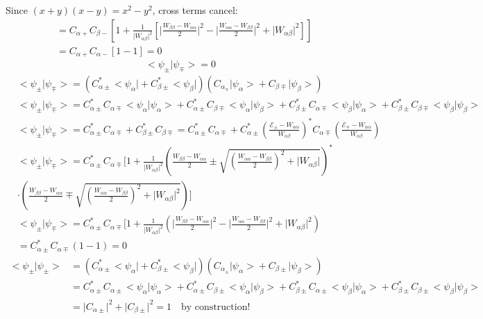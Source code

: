 \documentclass[12pt,fancychapters]{report}
\numberwithin{equation}{section}
\begin{document}
Since $(x+y)(x-y) = x^2-y^2$, cross terms cancel:
\begin{align*}
  &= C_{\alpha +}C_{\beta -} \left[ 1+\frac{1}{\big|W_{\alpha\beta}\big|^2}\left[
      \Bigg|\frac{W_{\beta\beta}-W_{\alpha\alpha}}{2}\Bigg|^2- \Bigg|\frac{
  W_{\alpha\alpha}-W_{\beta\beta}}{2}\Bigg|^2 + \big|W_{\alpha\beta}\big|^2\right]\right]\\
  &\boxed{= C_{\alpha +}C_{\alpha -}[1-1] = 0}
\end{align*}
\[
  \boxed{\big<\psi_\pm\big|\psi_\mp\big> = 0 }
\]
\begin{align*}
  &\big<\psi_\pm\big|\psi_\mp\big> = \left(C_{\alpha \pm}^*\big<\psi_\alpha\big| + C_{\beta \pm}^* 
  \big<\psi_\beta\big|\right)\left(C_{\alpha_\mp}\big|\psi_\alpha \big> + C_{\beta\mp}
  \big|\psi_\beta\big>\right)\\
  &\big<\psi_\pm\big|\psi_\mp\big> = C_{\alpha \pm}^* C_{\alpha\mp}\big<\psi_\alpha\big|\psi_
  \alpha\big>+C_{\alpha\pm}^*C_{\beta\mp}\big<\psi_\alpha\big|\psi_ \beta\big> + C_{\beta\pm}^*
  C_{\alpha\mp}\big<\psi_\beta\big|\psi_ \alpha\big>+C_{\beta\pm}^*C_{\beta\mp} 
  \big<\psi_\beta\big|\psi_ \beta\big>\\
  & \big<\psi_\pm\big|\psi_\mp\big>=  C_{\alpha \pm}^* C_{\alpha\mp} + C_{\beta\pm}^*C_{\beta\mp}=
   C_{\alpha \pm}^* C_{\alpha\mp} + C_{\alpha\pm}^*\left(\frac{\mathcal{E}_\pm - W_{\alpha\alpha}
   }{W_{\alpha\beta}}\right)^* C_{\alpha\mp}\left(\frac{\mathcal{E}_\mp - W_{\alpha\alpha}}
 {W_{\alpha\beta}}\right)\\
 &\big<\psi_\pm\big|\psi_\mp\big> = C_{\alpha \pm}^* C_{\alpha \mp}\Bigg[1+ \frac{1}{\big|W_{
     \alpha\beta}\big|^2}\left(\frac{W_{\beta\beta}-W_{\alpha\alpha}}{2}\pm 
     \sqrt{\left(\frac{W_{\alpha\alpha}-W_{\beta\beta}}{2}\right)^2+\big|W_{\alpha\beta}\big|}
   \right)^*\\
 &\cdot \left(\frac{W_{\beta\beta}-W_{\alpha\alpha}}{2} \mp \sqrt{\left(\frac{W_{\alpha\alpha}-
W_{\beta\beta}}{2}\right)^2 + \big|W_{\alpha\beta}\big|^2}\right)\Bigg]\\
  &\big<\psi_\pm\big|\psi_\mp\big> = C_{\alpha \pm}^* C_{\alpha \mp}\Bigg[1+ \frac{1}{\big|W_{
    \alpha\beta}\big|^2}\left( \Bigg|\frac{W_{\beta\beta}-W_{\alpha\alpha}}{2}\Bigg|^2- \Bigg|\frac{
  W_{\alpha\alpha}-W_{\beta\beta}}{2}\Bigg|^2 + \big|W_{\alpha\beta}\big|^2\right)\\
  &=C_{\alpha \pm}^* C_{\alpha \mp}(1-1) = 0
\end{align*}
\begin{align*}
  \big<\psi_\pm\big|\psi_\pm\big>& = \left(C_{\alpha \pm}^*\big<\psi_\alpha\big| + C_{\beta \pm}^* 
  \big<\psi_\beta\big|\right)\left(C_{\alpha_\pm}\big|\psi_\alpha \big> + C_{\beta\pm}
  \big|\psi_\beta\big>\right)\\
  &=C_{\alpha \pm}^* C_{\alpha\pm}\big<\psi_\alpha\big|\psi_
  \alpha\big>+C_{\alpha\pm}^*C_{\beta\pm}\big<\psi_\alpha\big|\psi_ \beta\big> + C_{\beta\pm}^*
  C_{\alpha\pm}\big<\psi_\beta\big|\psi_ \alpha\big>+C_{\beta\pm}^*C_{\beta\pm} 
  \big<\psi_\beta\big|\psi_ \beta\big>\\
  &= \big|C_{\alpha \pm}\big|^2 + \big|C_{\beta \pm} \big|^2 = 1\quad \text{by construction!}
\end{align*}
\end{document}
